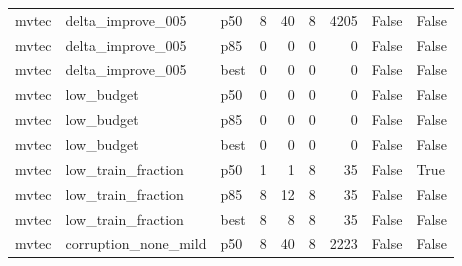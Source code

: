 \begin{tabular}{lllrrrrll}
   mvtec &    delta\_improve\_005 &    p50 &                   8 &                40 &                    8 &                         4205 &                                        False &                                False \\
   mvtec &    delta\_improve\_005 &    p85 &                   0 &                 0 &                    0 &                            0 &                                        False &                                False \\
   mvtec &    delta\_improve\_005 &   best &                   0 &                 0 &                    0 &                            0 &                                        False &                                False \\
   mvtec &           low\_budget &    p50 &                   0 &                 0 &                    0 &                            0 &                                        False &                                False \\
   mvtec &           low\_budget &    p85 &                   0 &                 0 &                    0 &                            0 &                                        False &                                False \\
   mvtec &           low\_budget &   best &                   0 &                 0 &                    0 &                            0 &                                        False &                                False \\
   mvtec &   low\_train\_fraction &    p50 &                   1 &                 1 &                    8 &                           35 &                                        False &                                 True \\
   mvtec &   low\_train\_fraction &    p85 &                   8 &                12 &                    8 &                           35 &                                        False &                                False \\
   mvtec &   low\_train\_fraction &   best &                   8 &                 8 &                    8 &                           35 &                                        False &                                False \\
   mvtec & corruption\_none\_mild &    p50 &                   8 &                40 &                    8 &                         2223 &                                        False &                                False \\

\end{tabular}
